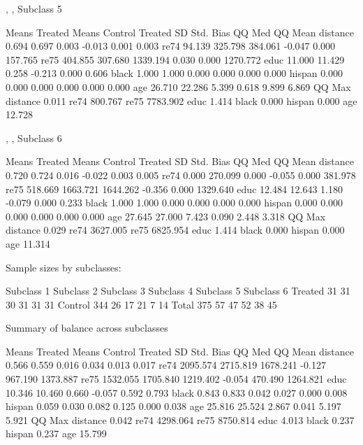 \documentclass[oneside,letterpaper,titlepage]{article}
\begin{document}
\begin{enumerate}
\begin{Schunk}
\begin{Soutput}
, , Subclass 5

         Means Treated Means Control Treated SD Std. Bias    QQ Med   QQ Mean
distance         0.694         0.697      0.003    -0.013     0.001     0.003
re74            94.139       325.798    384.061    -0.047     0.000   157.765
re75           404.855       307.680   1339.194     0.030     0.000  1270.772
educ            11.000        11.429      0.258    -0.213     0.000     0.606
black            1.000         1.000      0.000     0.000     0.000     0.000
hispan           0.000         0.000      0.000     0.000     0.000     0.000
age             26.710        22.286      5.399     0.618     9.899     6.869
            QQ Max
distance     0.011
re74       800.767
re75      7783.902
educ         1.414
black        0.000
hispan       0.000
age         12.728

, , Subclass 6

         Means Treated Means Control Treated SD Std. Bias    QQ Med   QQ Mean
distance         0.720         0.724      0.016    -0.022     0.003     0.005
re74             0.000       270.099      0.000    -0.055     0.000   381.978
re75           518.669      1663.721   1644.262    -0.356     0.000  1329.640
educ            12.484        12.643      1.180    -0.079     0.000     0.233
black            1.000         1.000      0.000     0.000     0.000     0.000
hispan           0.000         0.000      0.000     0.000     0.000     0.000
age             27.645        27.000      7.423     0.090     2.448     3.318
            QQ Max
distance     0.029
re74      3627.005
re75      6825.954
educ         1.414
black        0.000
hispan       0.000
age         11.314


Sample sizes by subclasses:

        Subclass 1 Subclass 2 Subclass 3 Subclass 4 Subclass 5 Subclass 6
Treated         31         31         30         31         31         31
Control        344         26         17         21          7         14
Total          375         57         47         52         38         45

Summary of balance across subclasses

         Means Treated Means Control Treated SD Std. Bias  QQ Med  QQ Mean
distance         0.566         0.559      0.016     0.034   0.013    0.017
re74          2095.574      2715.819   1678.241    -0.127 967.190 1373.887
re75          1532.055      1705.840   1219.402    -0.054 470.490 1264.821
educ            10.346        10.460      0.660    -0.057   0.592    0.793
black            0.843         0.833      0.042     0.027   0.000    0.008
hispan           0.059         0.030      0.082     0.125   0.000    0.038
age             25.816        25.524      2.867     0.041   5.197    5.921
           QQ Max
distance    0.042
re74     4298.064
re75     8750.814
educ        4.013
black       0.237
hispan      0.237
age        15.799


\end{Soutput}
\end{Schunk}
\end{enumerate}
\end{document}
